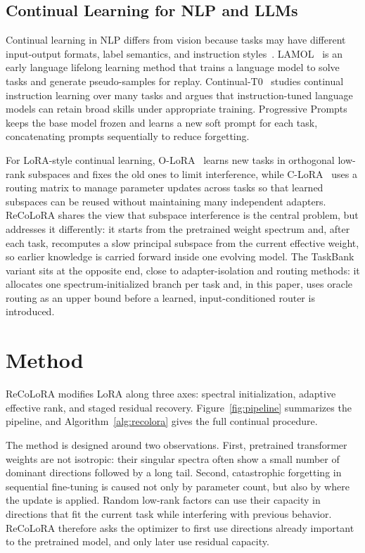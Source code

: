 \documentclass[11pt]{article}
\begin{document}
\subsection{Continual Learning for NLP and LLMs}
Continual learning in NLP differs from vision because tasks may have different input-output formats, label semantics, and instruction styles~\cite{ke2023continualnlp}. LAMOL~\cite{sun2019lamol} is an early language lifelong learning method that trains a language model to solve tasks and generate pseudo-samples for replay. Continual-T0~\cite{scialom2022continualt0} studies continual instruction learning over many tasks and argues that instruction-tuned language models can retain broad skills under appropriate training. Progressive Prompts~\cite{razdaibiedina2023progressiveprompts} keeps the base model frozen and learns a new soft prompt for each task, concatenating prompts sequentially to reduce forgetting.

For LoRA-style continual learning, O-LoRA~\cite{wang2023olora} learns new tasks in orthogonal low-rank subspaces and fixes the old ones to limit interference, while C-LoRA~\cite{zhang2025clora} uses a routing matrix to manage parameter updates across tasks so that learned subspaces can be reused without maintaining many independent adapters. ReCoLoRA shares the view that subspace interference is the central problem, but addresses it differently: it starts from the pretrained weight spectrum and, after each task, recomputes a slow principal subspace from the current effective weight, so earlier knowledge is carried forward inside one evolving model. The TaskBank variant sits at the opposite end, close to adapter-isolation and routing methods: it allocates one spectrum-initialized branch per task and, in this paper, uses oracle routing as an upper bound before a learned, input-conditioned router is introduced.

\section{Method}
ReCoLoRA modifies LoRA along three axes: spectral initialization, adaptive effective rank, and staged residual recovery. Figure~\ref{fig:pipeline} summarizes the pipeline, and Algorithm~\ref{alg:recolora} gives the full continual procedure.

The method is designed around two observations. First, pretrained transformer weights are not isotropic: their singular spectra often show a small number of dominant directions followed by a long tail. Second, catastrophic forgetting in sequential fine-tuning is caused not only by parameter count, but also by where the update is applied. Random low-rank factors can use their capacity in directions that fit the current task while interfering with previous behavior. ReCoLoRA therefore asks the optimizer to first use directions already important to the pretrained model, and only later use residual capacity.
\end{document}
